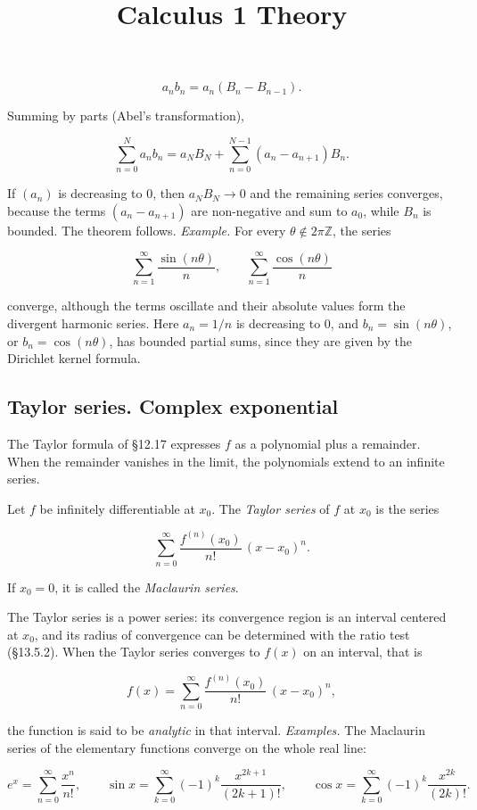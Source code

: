 \documentclass[11pt,a4paper]{article} \usepackage[T1]{fontenc}
\theoremstyle{plain} \newtheorem{theorem}{Theorem} \title{Calculus 1 Theory}
\begin{document}
\[
a_n b_n = a_n (B_n - B_{n-1}).
\]

Summing by parts (Abel's transformation),

\[
\sum_{n=0}^{N} a_n b_n = a_N B_N + \sum_{n=0}^{N-1} (a_n - a_{n+1}) B_n.
\]

If $(a_n)$ is decreasing to $0$, then $a_N B_N\to 0$ and the remaining series
converges, because the terms $(a_n - a_{n+1})$ are non-negative and sum to
$a_0$, while $B_n$ is bounded. The theorem follows. \emph{Example.} For every
$\theta\notin 2\pi\mathbb{Z}$, the series

\[
\sum_{n=1}^{\infty} \frac{\sin(n\theta)}{n}, \qquad \sum_{n=1}^{\infty} \frac{\cos(n\theta)}{n}
\]

converge, although the terms oscillate and their absolute values form the
divergent harmonic series. Here $a_n = 1/n$ is decreasing to $0$, and $b_n =
\sin(n\theta)$, or $b_n = \cos(n\theta)$, has bounded partial sums, since they
are given by the Dirichlet kernel formula.

\subsection {Taylor series. Complex exponential}

The Taylor formula of \S 12.17 expresses $f$ as a polynomial plus a remainder.
When the remainder vanishes in the limit, the polynomials extend to an infinite
series.

\begin{definition}
 Let $f$ be infinitely differentiable at $x_0$. The \emph{Taylor
series} of $f$ at $x_0$ is the series

\[
\sum_{n=0}^{\infty} \frac{f^{(n)}(x_0)}{n!}\,(x - x_0)^n.
\]

If $x_0 = 0$, it is called the \emph{Maclaurin series}.
\end{definition}

The Taylor series is a power series: its convergence region is an interval
centered at $x_0$, and its radius of convergence can be determined with the
ratio test (\S 13.5.2). When the Taylor series converges to $f(x)$ on an
interval, that is

\[
f(x) = \sum_{n=0}^{\infty} \frac{f^{(n)}(x_0)}{n!}\,(x - x_0)^n,
\]

the function is said to be \emph{analytic} in that interval. \emph{Examples.}
The Maclaurin series of the elementary functions converge on the whole real
line:

\[
e^x = \sum_{n=0}^{\infty} \frac{x^n}{n!}, \qquad \sin x = \sum_{k=0}^{\infty} (-1)^k \frac{x^{2k+1}}{(2k+1)!}, \qquad \cos x = \sum_{k=0}^{\infty} (-1)^k \frac{x^{2k}}{(2k)!}.
\]
\end{document}
